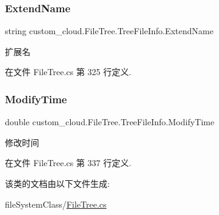 \subsubsection{\texorpdfstring{Extend\+Name}{ExtendName}}
{\footnotesize\ttfamily string custom\+\_\+cloud.\+File\+Tree.\+Tree\+File\+Info.\+Extend\+Name\hspace{0.3cm}{\ttfamily [get]}}



扩展名 



在文件 File\+Tree.\+cs 第 325 行定义.

\mbox{\label{classcustom__cloud_1_1_file_tree_1_1_tree_file_info_a087423420ceeb122fb08d6070a1745b2}} 
\subsubsection{\texorpdfstring{Modify\+Time}{ModifyTime}}
{\footnotesize\ttfamily double custom\+\_\+cloud.\+File\+Tree.\+Tree\+File\+Info.\+Modify\+Time\hspace{0.3cm}{\ttfamily [get]}}



修改时间 



在文件 File\+Tree.\+cs 第 337 行定义.



该类的文档由以下文件生成\+:\begin{DoxyCompactItemize}
\item 
file\+System\+Class/\hyperlink{_file_tree_8cs}{File\+Tree.\+cs}\end{DoxyCompactItemize}
